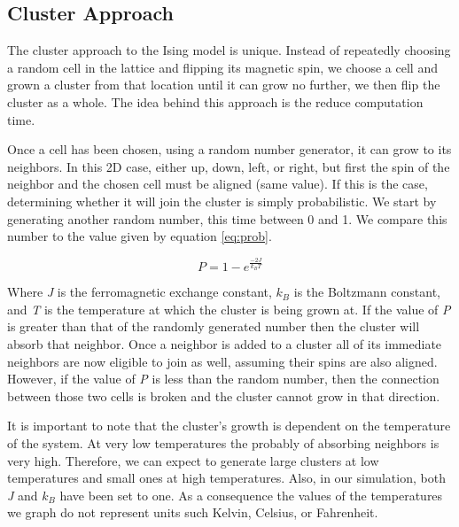 \documentclass[a4paper,twoside,12pt]{article}
\begin{document}
\subsection{Cluster Approach}
The cluster approach to the Ising model is unique. Instead of repeatedly choosing a random cell in the lattice and flipping its magnetic spin, we choose a cell and grown a cluster from that location until it can grow no further, we then flip the cluster as a whole. The idea behind this approach is the reduce computation time. 

\vspace{3mm}

\noindent Once a cell has been chosen, using a random number generator, it can grow to its neighbors. In this 2D case, either up, down, left, or right, but first the spin of the neighbor and the chosen cell must be aligned (same value). If this is the case, determining whether it will join the cluster is simply probabilistic. We start by generating another random number, this time between 0 and 1. We compare this number to the value given by equation \ref{eq:prob}. 

\begin{equation}
\label{eq:prob}
P = 1 - e^{\frac{-2J}{k_{B}T}}
\end{equation}

\noindent Where \textit{J} is the ferromagnetic exchange constant, $k_{B}$ is the Boltzmann constant, and \textit{T} is the temperature at which the cluster is being grown at. If the value of \textit{P} is greater than that of the randomly generated number then the cluster will absorb that neighbor. Once a neighbor is added to a cluster all of its immediate neighbors are now eligible to join as well, assuming their spins are also aligned. However, if the value of \textit{P} is less than the random number, then the connection between those two cells is broken and the cluster cannot grow in that direction. 

\vspace{3mm}

\noindent It is important to note that the cluster's growth is dependent on the temperature of the system. At very low temperatures the probably of absorbing neighbors is very high. Therefore, we can expect to generate large clusters at low temperatures and small ones at high temperatures.
Also, in our simulation, both \textit{J} and $k_{B}$ have been set to one. As a consequence the values of the temperatures we graph do not represent units such Kelvin, Celsius, or Fahrenheit.
\end{document}
